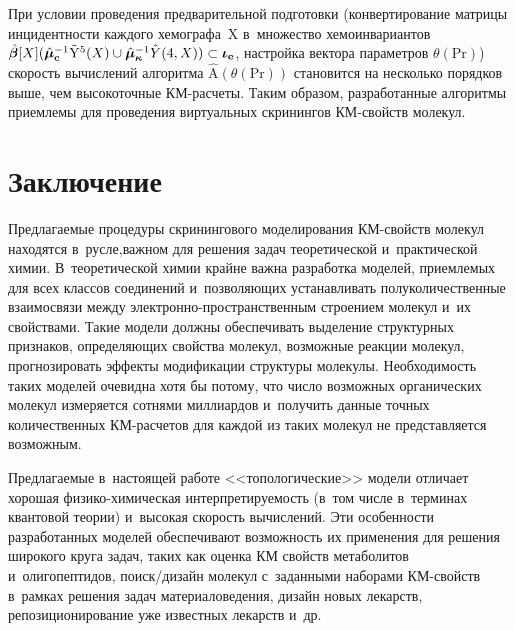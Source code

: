 \begin{multicols}{2}
При условии проведения предварительной подготовки (конвертирование 
матрицы ин\-ци\-дент\-ности каждого хемографа~X в~множество хемоинвариантов 
$ \hat{\bm{\beta}}[{X}](\hat{\bm{\mu}}^{-1}_{\mathbf{c}} 
\tilde{\mathrm{Y}}^5({X})\cup 
\hat{\bm{\mu}}^{-1}_{\bm{\kappa}}\hat{Y}(4,{X}))\hm\subset \bm{\iota}_{\mathbf{e}}$,\linebreak 
настройка вектора па\-ра\-мет\-ров $\theta(\mathrm{Pr})$) скорость вычислений 
алгоритма $\hat{\mathrm{A}}(\theta(\mathrm{Pr}))$ становится на несколько 
порядков выше, чем высокоточные \mbox{КМ-рас}\-че\-ты. Таким образом, 
разработанные алгоритмы приемлемы для проведения виртуальных скринингов 
КМ-свойств молекул. 

\vspace*{-6pt}

\section{Заключение}

\vspace*{-2pt}
    
Предлагаемые процедуры скринингового моделирования КМ-свойств молекул 
находятся в~русле,\linebreak важном для решения задач теоретической и~практической 
химии. В~теоретической химии крайне важна разработка моделей, приемлемых 
для всех классов соединений и~поз\-во\-ля\-ющих уста\-нав\-ли\-вать 
\mbox{полуколичественные} взаимосвязи между  
элект\-рон\-но-про\-стран\-ст\-вен\-ным строением молекул и~их свойствами. 
Такие модели должны обеспечивать выделение структурных признаков, 
определяющих свойства молекул, возможные реакции молекул, прогнозировать 
эффекты модификации структуры молекулы. Необходимость таких моделей 
очевидна хотя бы потому, что число возможных органических молекул 
измеряется сотнями миллиардов и~получить данные точных количественных 
КМ-рас\-че\-тов для каждой из таких молекул не представляется возможным. 
     
     Предлагаемые в~настоящей работе <<топологические>> модели отличает 
хорошая фи\-зи\-ко-хи\-ми\-че\-ская ин\-тер\-пре\-ти\-ру\-емость (в~том чис\-ле 
в~терминах кван\-то\-вой тео\-рии) и~высокая ско\-рость \mbox{вычислений}. Эти 
особенности разработанных моделей обеспечивают возможность их 
применения для решения широкого круга задач, таких как оценка 
КМ свойств метаболитов и~олигопептидов, по\-иск/ди\-зайн 
молекул с~заданными наборами КМ-свойств в~рамках решения задач 
материаловедения, дизайн новых лекарств, репозиционирование уже известных 
лекарств и~др.


\end{multicols}
